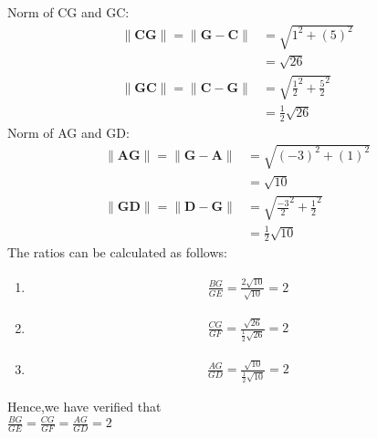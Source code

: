 \documentclass[journal,12pt,onecolumn]{IEEEtran}
\theoremstyle{remark}
\begin{document}
Norm of CG and GC:\\
\begin{align}
\|\mathbf{CG}\|=\|\mathbf{G-C}\|
              &=\sqrt{1^2+(5)^2}\\
              &=\sqrt{26}\\
\|\mathbf{GC}\|=\|\mathbf{C-G}\|
              &=\sqrt{\frac{1}{2}^2+\frac{5}{2}^2}\\
              &=\frac{1}{2}\sqrt{26}
\end{align}
Norm of AG and GD:\\
\begin{align}
\|\mathbf{AG}\|=\|\mathbf{G-A}\|
               &=\sqrt{(-3)^2+(1)^2}\\
              &=\sqrt{10}\\
\|\mathbf{GD}\|=\|\mathbf{D-G}\|
              &=\sqrt{\frac{-3}{2}^2+\frac{1}{2}^2}\\
              &=\frac{1}{2}\sqrt{10}
\end{align}
The ratios can be calculated as follows:\\
\begin{enumerate} 
\item
\begin{align}
 \frac{BG}{GE} =\frac{2\sqrt{10}}{\sqrt{10}}=2
\end{align}
\item 
\begin{align}
 \frac{CG}{GF}=\frac{\sqrt{26}}{\frac{1}{2}\sqrt{26}}=2
\end{align}
\item 
\begin{align}
 \frac{AG}{GD}=\frac{\sqrt{10}}{\frac{1}{2}\sqrt{10}}=2
\end{align}
\end{enumerate}
Hence,we have verified that \\
$\frac{BG}{GE}=\frac{CG}{GF}=\frac{AG}{GD}=2$
\end{document}
